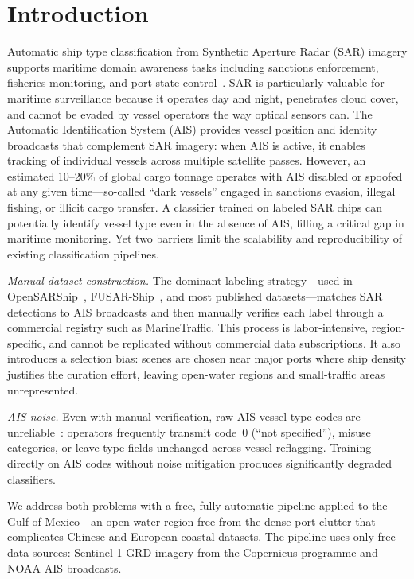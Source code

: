 \documentclass[journal]{IEEEtran}
\begin{document}
\section{Introduction}

Automatic ship type classification from Synthetic Aperture Radar (SAR)
imagery supports maritime domain awareness tasks including sanctions
enforcement, fisheries monitoring, and port state control~\cite{zhang2021,hou2020}.
SAR is particularly valuable for maritime surveillance because it operates
day and night, penetrates cloud cover, and cannot be evaded by vessel
operators the way optical sensors can.
The Automatic Identification System (AIS) provides vessel position and
identity broadcasts that complement SAR imagery: when AIS is active,
it enables tracking of individual vessels across multiple satellite passes.
However, an estimated 10--20\% of global cargo tonnage operates with
AIS disabled or spoofed at any given time---so-called ``dark vessels''
engaged in sanctions evasion, illegal fishing, or illicit cargo transfer.
A classifier trained on labeled SAR chips can potentially identify vessel
type even in the absence of AIS, filling a critical gap in maritime
monitoring.
Yet two barriers limit the scalability and reproducibility of existing
classification pipelines.

\textit{Manual dataset construction.}
The dominant labeling strategy---used in OpenSARShip~\cite{huang2018},
FUSAR-Ship~\cite{hou2020}, and most published datasets---matches SAR
detections to AIS broadcasts and then manually verifies each label
through a commercial registry such as MarineTraffic.
This process is labor-intensive, region-specific, and cannot be replicated
without commercial data subscriptions.
It also introduces a selection bias: scenes are chosen near major ports
where ship density justifies the curation effort, leaving open-water
regions and small-traffic areas unrepresented.

\textit{AIS noise.}
Even with manual verification, raw AIS vessel type codes are unreliable~\cite{harati2007ais}:
operators frequently transmit code~0 (``not specified''), misuse
categories, or leave type fields unchanged across vessel reflagging.
Training directly on AIS codes without noise mitigation produces
significantly degraded classifiers.

We address both problems with a free, fully automatic pipeline applied
to the Gulf of Mexico---an open-water region free from the dense port
clutter that complicates Chinese and European coastal datasets.
The pipeline uses only free data sources: Sentinel-1 GRD imagery from
the Copernicus programme and NOAA AIS broadcasts.
\end{document}
